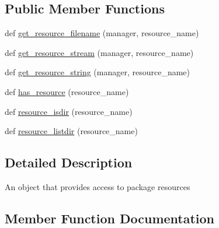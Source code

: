 \subsection*{Public Member Functions}
\begin{DoxyCompactItemize}
\item 
def \hyperlink{classpkg__resources_1_1IResourceProvider_a1eaea3b763c5c7752fd697a636e7d7d8}{get\+\_\+resource\+\_\+filename} (manager, resource\+\_\+name)
\item 
def \hyperlink{classpkg__resources_1_1IResourceProvider_ac027f5f8836dadb75f0d05c4d919fa1b}{get\+\_\+resource\+\_\+stream} (manager, resource\+\_\+name)
\item 
def \hyperlink{classpkg__resources_1_1IResourceProvider_a2c860463185ea5a8c02d904afaa72a31}{get\+\_\+resource\+\_\+string} (manager, resource\+\_\+name)
\item 
def \hyperlink{classpkg__resources_1_1IResourceProvider_a3be0ded1d6af19617ec116f70ea16320}{has\+\_\+resource} (resource\+\_\+name)
\item 
def \hyperlink{classpkg__resources_1_1IResourceProvider_a02156b99af212145832c8b41b9448499}{resource\+\_\+isdir} (resource\+\_\+name)
\item 
def \hyperlink{classpkg__resources_1_1IResourceProvider_a641c57dcce0cf87c1c58d64b4528d695}{resource\+\_\+listdir} (resource\+\_\+name)
\end{DoxyCompactItemize}


\subsection{Detailed Description}
\begin{DoxyVerb}An object that provides access to package resources\end{DoxyVerb}
 

\subsection{Member Function Documentation}
\mbox{\label{classpkg__resources_1_1IResourceProvider_a1eaea3b763c5c7752fd697a636e7d7d8}} 
